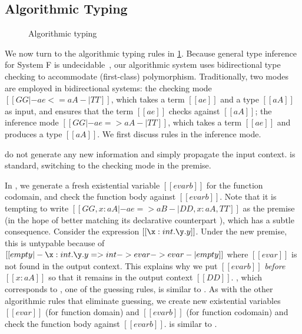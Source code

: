 \subsection{Algorithmic Typing}
\label{sec:algo:typing}

\begin{figure}[t]
  \centering
  \begin{small}





  \end{small}
  \caption{Algorithmic typing}
  \label{fig:algo:typing}
\end{figure}

We now turn to the algorithmic typing rules in \cref{fig:algo:typing}. Because
general type inference for System F is undecidable~\citep{WELLS1999111}, our algorithmic
system uses bidirectional type checking to accommodate (first-class)
polymorphism. Traditionally, two modes are employed in bidirectional systems:
the checking mode $[[ GG |- ae <= aA -| TT ]]$, which takes a term $[[ae]]$ and a type $[[aA]]$ as
input, and ensures that the term $[[ae]]$ checks against $[[aA]]$; the
inference mode $[[ GG |- ae => aA -| TT ]]$, which takes a term $[[ae]]$ and
produces a type $[[aA]]$. We first discuss rules in the inference mode.

 do not generate any new information and simply propagate
the input context.  is standard, switching to the checking
mode in the premise.

In , we generate a fresh existential variable $[[evarb]]$ for
the function codomain, and check the function body against $[[evarb]]$. Note that
it is tempting to write $[[ GG, x : aA |- ae => aB -| DD, x : aA, TT ]]$ as the
premise (in the hope of better matching its declarative counterpart ), which has
a subtle consequence. Consider the expression $[[ \x : int. \y . y ]]$. Under
the new premise, this is untypable because of
$[[ empty |- \x : int. \y . y => int -> evar -> evar -| empty ]]$ where $[[evar]]$ is not found
in the output context. This explains why we put $[[evarb]]$ \emph{before} $ [[ x : aA ]]  $
so that it remains in the output context $[[DD]]$.
, which corresponds to , one of the
guessing rules, is similar to . As with the other algorithmic
rules that eliminate guessing, we create new existential variables $[[evar]]$
(for function domain) and $[[evarb]]$ (for function codomain) and check the function body against $[[evarb]]$.
 is similar to .

